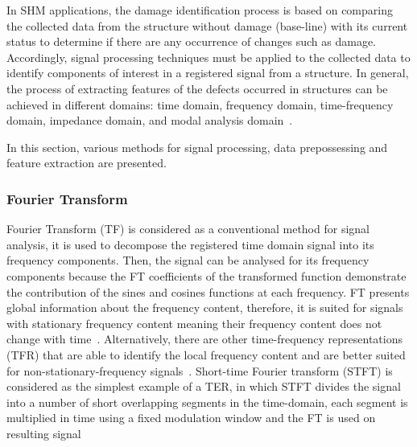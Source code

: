In SHM applications, the damage identification process is based on comparing the collected data from the structure without damage (base-line) with its current status to determine if there are any occurrence of changes such as damage.
Accordingly, signal processing techniques must be applied to the collected data to identify components of interest in a registered signal from a structure.
In general, the process of extracting features of the defects occurred in structures can be achieved in different domains: time domain, frequency domain, time-frequency domain, impedance domain, and modal analysis domain~\cite{Khan2019}.

In this section, various methods for signal processing, data prepossessing and feature extraction are presented.

\subsubsection{Fourier Transform} 
Fourier Transform (TF) is considered as a conventional method for signal analysis, it is used to decompose the registered time domain signal into its frequency components. 
Then, the signal can be analysed for its frequency components because the FT coefficients of the transformed function demonstrate the contribution of the sines and cosines functions at each frequency.
FT presents global information about the frequency content, therefore, it is suited for signals with stationary frequency content meaning their frequency content does not change with time~\cite{Raghavan2006}.
Alternatively, there are other time-frequency representations (TFR) that are able to identify the local frequency content and are better suited for non-stationary-frequency signals~\cite{Raghavan2006}.
Short-time Fourier transform (STFT) is considered as the simplest example of a TER, in which STFT divides the signal into a number of short overlapping segments in the time-domain, each segment is multiplied in time using a fixed modulation window and the FT is used on resulting signal~\cite{Raghavan2006}

